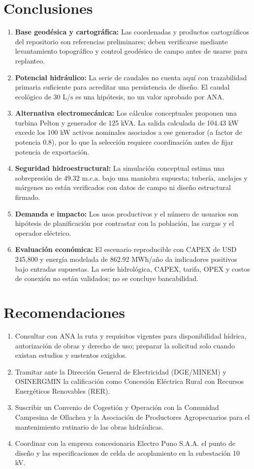 \documentclass[11pt,a4paper]{report}
\begin{document}
\section{Conclusiones}
\begin{enumerate}
    \item \textbf{Base geodésica y cartográfica:} Las coordenadas y productos cartográficos del repositorio son referencias preliminares; deben verificarse mediante levantamiento topográfico y control geodésico de campo antes de usarse para replanteo.
    \item \textbf{Potencial hidráulico:} La serie de caudales no cuenta aquí con trazabilidad primaria suficiente para acreditar una persistencia de diseño. El caudal ecológico de $30\text{ L/s}$ es una hipótesis, no un valor aprobado por ANA.
    \item \textbf{Alternativa electromecánica:} Los cálculos conceptuales proponen una turbina Pelton y generador de 125 kVA. La salida calculada de 104.43 kW excede los 100 kW activos nominales asociados a ese generador (a factor de potencia 0.8), por lo que la selección requiere coordinación antes de fijar potencia de exportación.
    \item \textbf{Seguridad hidroestructural:} La simulación conceptual estima una sobrepresión de $49.32\text{ m.c.a.}$ bajo una maniobra supuesta; tubería, anclajes y márgenes no están verificados con datos de campo ni diseño estructural firmado.
    \item \textbf{Demanda e impacto:} Los usos productivos y el número de usuarios son hipótesis de planificación por contrastar con la población, las cargas y el operador eléctrico.
    \item \textbf{Evaluación económica:} El escenario reproducible con CAPEX de USD 245,800 y energía modelada de 862.92 MWh/año da indicadores positivos bajo entradas supuestas. La serie hidrológica, CAPEX, tarifa, OPEX y costos de conexión no están validados; no se concluye bancabilidad.
\end{enumerate}

\section{Recomendaciones}
\begin{enumerate}
    \item Consultar con ANA la ruta y requisitos vigentes para disponibilidad hídrica, autorización de obras y derecho de uso; preparar la solicitud solo cuando existan estudios y sustentos exigidos.
    \item Tramitar ante la Dirección General de Electricidad (DGE/MINEM) y OSINERGMIN la calificación como Concesión Eléctrica Rural con Recursos Energéticos Renovables (RER).
    \item Suscribir un Convenio de Cogestión y Operación con la Comunidad Campesina de Ollachea y la Asociación de Productores Agropecuarios para el mantenimiento rutinario de las obras hidráulicas.
    \item Coordinar con la empresa concesionaria Electro Puno S.A.A. el punto de diseño y las especificaciones de celda de acoplamiento en la subestación 10 kV.
\end{enumerate}
\end{document}
